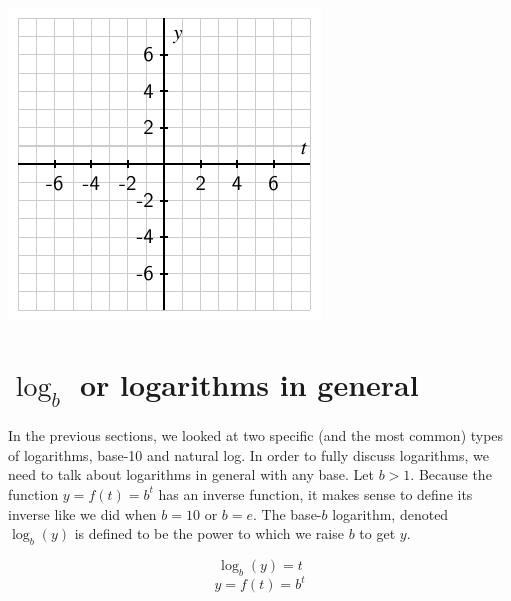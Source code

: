 \documentclass[nooutcomes]{ximera}
\begin{document}
\begin{exploration}
\begin{enumerate}[label=\alph*.]
\includegraphics[width=.8\linewidth]{images/exp-log-blank-axes}

\end{enumerate}
%
\end{exploration}

%
%
%
\section{$\log_b$ or logarithms in general}
 In the previous sections, we looked at two specific (and the most common) types of logarithms, base-10 and natural log. In order to fully discuss logarithms, we need to talk about logarithms in general with any base. Let $b>1$. Because the function $y=f(t)=b^t$ has an inverse function, it makes sense to define its inverse like we did when $b=10$ or $b=e$. The base-$b$ logarithm, denoted $\log_{b}(y)$ is defined to be the power to which we raise $b$ to get $y$. 

\[
\log_{b}(y)=t
\]
\[
y=f(t)=b^t
\]
\end{document}
